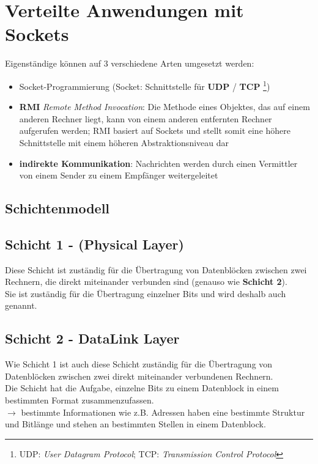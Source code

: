 \section{Verteilte Anwendungen mit Sockets}

Eigenständige  können auf 3 verschiedene Arten umgesetzt werden:

\begin{itemize}
    \item Socket-Programmierung (Socket: Schnittstelle für \textbf{UDP} / \textbf{TCP} \footnote{
    UDP: \textit{User Datagram Protocol}; TCP: \textit{Transmission Control Protocol}
    })
    \item \textbf{RMI} \textit{Remote Method Invocation}: Die Methode eines Objektes, das auf einem anderen Rechner liegt, kann von einem anderen entfernten Rechner aufgerufen werden; RMI basiert auf Sockets und stellt somit eine höhere Schnittstelle mit einem höheren Abstraktionsniveau dar
    \item \textbf{indirekte Kommunikation}: Nachrichten werden durch einen Vermittler von einem Sender zu einem Empfänger weitergeleitet
\end{itemize}


\subsection{Schichtenmodell}

\subsection*{Schicht 1 - (Physical Layer)}

Diese Schicht ist zuständig für die Übertragung von Datenblöcken zwischen zwei Rechnern, die direkt miteinander verbunden sind (genauso wie \textbf{Schicht 2}).\\
Sie ist zuständig für die Übertragung einzelner Bits und wird deshalb auch  genannt.

\subsection*{Schicht 2 - DataLink Layer}

Wie Schicht 1 ist auch diese Schicht zuständig für die Übertragung von Datenblöcken zwischen zwei direkt miteinander verbundenen Rechnern.\\

Die Schicht hat die Aufgabe, einzelne Bits zu einem Datenblock in einem bestimmten Format zusammenzufassen.\\
$\rightarrow$ bestimmte Informationen wie z.B. Adressen haben eine bestimmte Struktur und Bitlänge und stehen an bestimmten Stellen in einem Datenblock.\\


